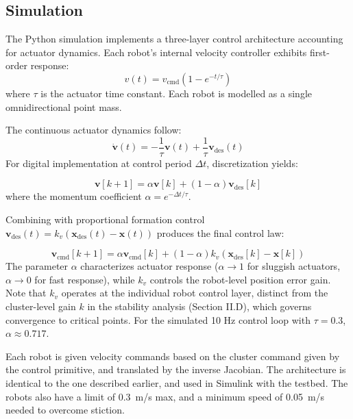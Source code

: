 \documentclass[lettersize,journal]{IEEEtran}
\begin{document}
\subsection{Simulation}

\noindent The Python simulation implements a three-layer control architecture accounting for actuator dynamics. Each robot's internal velocity controller exhibits first-order response:
\begin{equation}
v(t) = v_{\text{cmd}}(1 - e^{-t/\tau})
\end{equation}
where
$\tau$ is the actuator time constant. Each robot is modelled as a single omnidirectional point mass.

The continuous actuator dynamics follow:
\begin{equation}
\dot{\mathbf{v}}(t) = -\frac{1}{\tau}\mathbf{v}(t) + \frac{1}{\tau}\mathbf{v}_{\text{des}}(t)
\label{eq:continuous}
\end{equation}
For digital implementation at control period $\Delta t$, discretization yields:

\begin{equation}
\mathbf{v}[k+1] = \alpha \mathbf{v}[k] + (1-\alpha)\mathbf{v}_{\text{des}}[k]
\label{eq:momentum}
\end{equation}
where the momentum coefficient
$\alpha = e^{-\Delta t/\tau}$. 

Combining with proportional formation control $\mathbf{v}_{\text{des}}(t) = k_v(\mathbf{x}_{\text{des}}(t) - \mathbf{x}(t))$ produces the final control law:

\begin{equation}
\mathbf{v}_{\text{cmd}}[k+1] = \alpha \mathbf{v}_{\text{cmd}}[k] + (1-\alpha)k_v(\mathbf{x}_{\text{des}}[k] - \mathbf{x}[k])
\label{eq:final}
\end{equation}
The parameter $\alpha$ characterizes actuator response ($\alpha \to 1$ for sluggish actuators, $\alpha \to 0$ for fast response), while $k_v$ controls the robot-level position error gain. Note that $k_v$ operates at the individual robot control layer, distinct from the cluster-level gain $k$ in the stability analysis (Section II.D), which governs convergence to critical points. For the simulated 10 Hz control loop with $\tau = 0.3$, $\alpha \approx 0.717$.

Each robot is given velocity commands based on the cluster command given by the control primitive, and translated by the inverse Jacobian. The architecture is identical to the one described earlier, and used in Simulink with the testbed.
The robots also have a limit of 0.3~m/s max, and a minimum speed of 0.05~m/s needed to overcome stiction.
\end{document}

